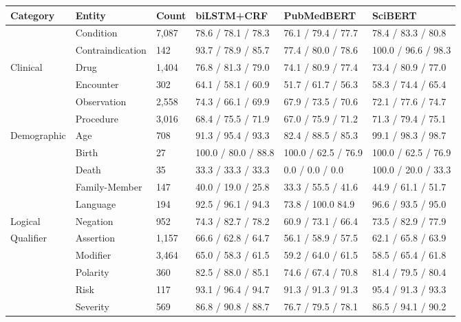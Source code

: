 \def\arraystretch{1.4}
\begin{tabular}{m{2cm} m{3.2cm} m{1.4cm} m{2.7cm} m{2.7cm} m{2.7cm}}
    \toprule
    \textbf{Category} & \textbf{Entity} & \textbf{Count} & \textbf{biLSTM+CRF} & \textbf{PubMedBERT} & \textbf{SciBERT} \\ \midrule
     & Condition & 7,087 & 78.6 / 78.1 / 78.3 & 76.1 / 79.4 / 77.7 & 78.4 / 83.3 / 80.8 \\
     & Contraindication & 142 & 93.7 / 78.9 / 85.7 & 77.4 / 80.0 / 78.6 & 100.0 / 96.6 / 98.3 \\
    Clinical & Drug & 1,404 & 76.8 / 81.3 / 79.0 & 74.1 / 80.9 / 77.4 & 73.4 / 80.9 / 77.0 \\
     & Encounter & 302 & 64.1 / 58.1 / 60.9 & 51.7 / 61.7 / 56.3 & 58.3 / 74.4 / 65.4 \\
     & Observation & 2,558 & 74.3 / 66.1 / 69.9 & 67.9 / 73.5 / 70.6 & 72.1 / 77.6 / 74.7 \\
     & Procedure & 3,016 & 68.4 / 75.5 / 71.9 & 67.0 / 75.9 / 71.2 & 71.3 / 79.4 / 75.1 \\
    \hline       
    \multirow{4}{}[-4pt]{\mbox{Demographic}} & 
        Age & 708 & 91.3 / 95.4 / 93.3 & 82.4 / 88.5 / 85.3 & 99.1 / 98.3 / 98.7 \\
     & Birth & 27 & 100.0 / 80.0 / 88.8 & 100.0 / 62.5 / 76.9 & 100.0 / 62.5 / 76.9 \\
     & Death & 35 & 33.3 / 33.3 / 33.3 & 0.0 / 0.0 / 0.0 & 100.0 / 20.0 / 33.3 \\
     & Family-Member & 147 & 40.0 / 19.0 / 25.8 & 33.3 / 55.5 / 41.6 & 44.9 / 61.1 / 51.7 \\
     & Language & 194 & 92.5 / 96.1 / 94.3 & 73.8 / 100.0 84.9 & 96.6 / 93.5 / 95.0 \\
    \hline
    Logical & Negation & 952 & 74.3 / 82.7 / 78.2 & 60.9 / 73.1 / 66.4 & 73.5 / 82.9 / 77.9 \\
    \hline
    \multirow{6}{}[-5pt]{\mbox{Qualifier}} &
        Assertion & 1,157 & 66.6 / 62.8 / 64.7 & 56.1 / 58.9 / 57.5 & 62.1 / 65.8 / 63.9 \\
         & Modifier & 3,464 & 65.0 / 58.3 / 61.5 & 59.2 / 64.0 / 61.5 & 58.5 / 65.4 / 61.8 \\
         & Polarity & 360 & 82.5 / 88.0 / 85.1 & 74.6 / 67.4 / 70.8 & 81.4 / 79.5 / 80.4 \\
         & Risk & 117 & 93.1 / 96.4 / 94.7 & 91.3 / 91.3 / 91.3 & 95.4 / 91.3 / 93.3 \\
         & Severity & 569 & 86.8 / 90.8 / 88.7 & 76.7 / 79.5 / 78.1 & 86.5 / 94.1 / 90.2 \\

\end{tabular}
